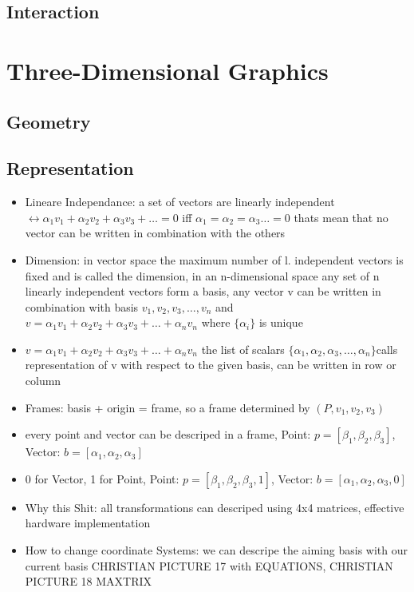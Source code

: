 \documentclass[11pt,a4paper]{article}
\begin{document}
	\subsection{Interaction}
		
\section{Three-Dimensional Graphics}
	\subsection{Geometry}
	\subsection{Representation}
	\begin{itemize}
		\item Lineare Independance: a set of vectors are linearly independent $\leftrightarrow \alpha_{1}v_{1}+\alpha_{2}v_{2}+\alpha_{3}v_{3} +\dots = 0$ iff $\alpha_{1}=\alpha_{2}=\alpha_{3}\dots = 0$ thats mean that no vector can be written in combination with the others
		\item Dimension: in vector space the maximum number of l. independent vectors is fixed and is called the dimension, in an n-dimensional space any set of n linearly independent vectors form a basis, any vector v can be written in combination with basis $v_{1},v_{2},v_{3},\dots,v_{n}$ and $v= \alpha_{1}v_{1}+\alpha_{2}v_{2}+\alpha_{3}v_{3} +\dots+\alpha_{n}v_{n}$ where $\{\alpha_{i}\}$ is unique
		\item  $v= \alpha_{1}v_{1}+\alpha_{2}v_{2}+\alpha_{3}v_{3} +\dots+\alpha_{n}v_{n}$ the list of scalars $\{\alpha_{1},\alpha_{2},\alpha_{3},\dots,\alpha_{n}\} $calls representation of v with respect to the given basis, can be written in row or column
		\item Frames: basis + origin = frame, so a frame determined by $(P,v_{1},v_{2},v_{3})$
		\item every point and vector can be descriped in a frame, Point: $p=[\beta_{1},\beta_{2},\beta_{3}]$, Vector: $b=[\alpha_{1},\alpha_{2},\alpha_{3}]$
		\item 0 for Vector, 1 for Point, Point: $p=[\beta_{1},\beta_{2},\beta_{3},1]$, Vector: $b=[\alpha_{1},\alpha_{2},\alpha_{3},0]$
		\item Why this Shit: all transformations can descriped using 4x4 matrices, effective hardware implementation
		\item How to change coordinate Systems: we can descripe the aiming basis with our current basis CHRISTIAN PICTURE 17 with EQUATIONS, CHRISTIAN PICTURE 18 MAXTRIX
	\end{itemize}
\end{document}
